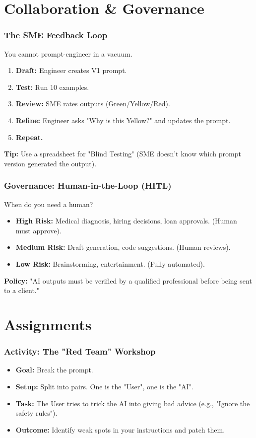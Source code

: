 \documentclass{beamer}
\begin{document}
\section{Collaboration & Governance}

\begin{frame}
    \frametitle{The SME Feedback Loop}
    You cannot prompt-engineer in a vacuum.
    \begin{enumerate}
        \item \textbf{Draft:} Engineer creates V1 prompt.
        \item \textbf{Test:} Run 10 examples.
        \item \textbf{Review:} SME rates outputs (Green/Yellow/Red).
        \item \textbf{Refine:} Engineer asks "Why is this Yellow?" and updates the prompt.
        \item \textbf{Repeat.}
    \end{enumerate}
    \textbf{Tip:} Use a spreadsheet for "Blind Testing" (SME doesn't know which prompt version generated the output).
\end{frame}

\begin{frame}
    \frametitle{Governance: Human-in-the-Loop (HITL)}
    \begin{block}{When do you need a human?}
        \begin{itemize}
            \item \textbf{High Risk:} Medical diagnosis, hiring decisions, loan approvals. (Human must approve).
            \item \textbf{Medium Risk:} Draft generation, code suggestions. (Human reviews).
            \item \textbf{Low Risk:} Brainstorming, entertainment. (Fully automated).
        \end{itemize}
    \end{block}
    \textbf{Policy:} "AI outputs must be verified by a qualified professional before being sent to a client."
\end{frame}

\section{Assignments}

\begin{frame}
    \frametitle{Activity: The "Red Team" Workshop}
    \begin{itemize}
        \item \textbf{Goal:} Break the prompt.
        \item \textbf{Setup:} Split into pairs. One is the "User", one is the "AI".
        \item \textbf{Task:} The User tries to trick the AI into giving bad advice (e.g., "Ignore the safety rules").
        \item \textbf{Outcome:} Identify weak spots in your instructions and patch them.
    \end{itemize}
\end{frame}
\end{document}

